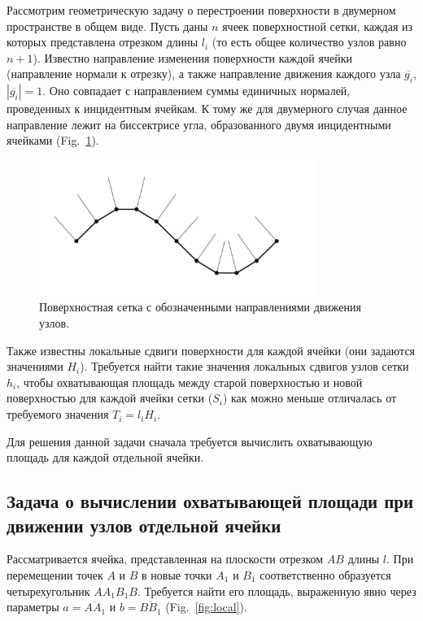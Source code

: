 \documentclass[
11pt,%
tightenlines,%
twoside,%
onecolumn,%
nofloats,%
nobibnotes,%
nofootinbib,%
superscriptaddress,%
noshowpacs,%
centertags]%
{revtex4}
\begin{document}
Рассмотрим геометрическую задачу о перестроении поверхности в двумерном пространстве в общем виде.
Пусть даны $n$ ячеек поверхностной сетки, каждая из которых представлена отрезком длины $l_i$ (то есть общее количество узлов равно $n + 1$).
Известно направление изменения поверхности каждой ячейки (направление нормали к отрезку), а также направление движения каждого узла $\overline{g_i}$, $|\overline{g_i}| = 1$.
Оно совпадает с направлением суммы единичных нормалей, проведенных к инцидентным ячейкам.
К тому же для двумерного случая данное направление лежит на биссектрисе угла, образованного двумя инцидентными ячейками \cite{Fortin} (Fig.~\ref{fig:grid_normals}).

\begin{figure}[h]
\setcaptionmargin{5mm}
\onelinecaptionstrue
\includegraphics[width=0.8\textwidth]{pics/grid_normals.pdf}
\caption{Поверхностная сетка с обозначенными направлениями движения узлов.}
\label{fig:grid_normals}
\end{figure}

Также известны локальные сдвиги поверхности для каждой ячейки (они задаются значениями $H_i$).
Требуется найти такие значения локальных сдвигов узлов сетки $h_i$, чтобы охватывающая площадь между старой поверхностью и новой поверхностью для каждой ячейки сетки ($S_i$) как можно меньше отличалась от требуемого значения $T_i = l_iH_i$.

Для решения данной задачи сначала требуется вычислить охватывающую площадь для каждой отдельной ячейки.

\subsection{Задача о вычислении охватывающей площади при движении узлов отдельной ячейки}

Рассматривается ячейка, представленная на плоскости отрезком $AB$ длины $l$.
При перемещении точек $A$ и $B$ в новые точки $A_1$ и $B_1$ соответственно образуется четырехугольник $AA_1B_1B$.
Требуется найти его площадь, выраженную явно через параметры $a = \overline{AA_1}$ и $b = \overline{BB_1}$ (Fig.~\ref{fig:local}).
\end{document}
